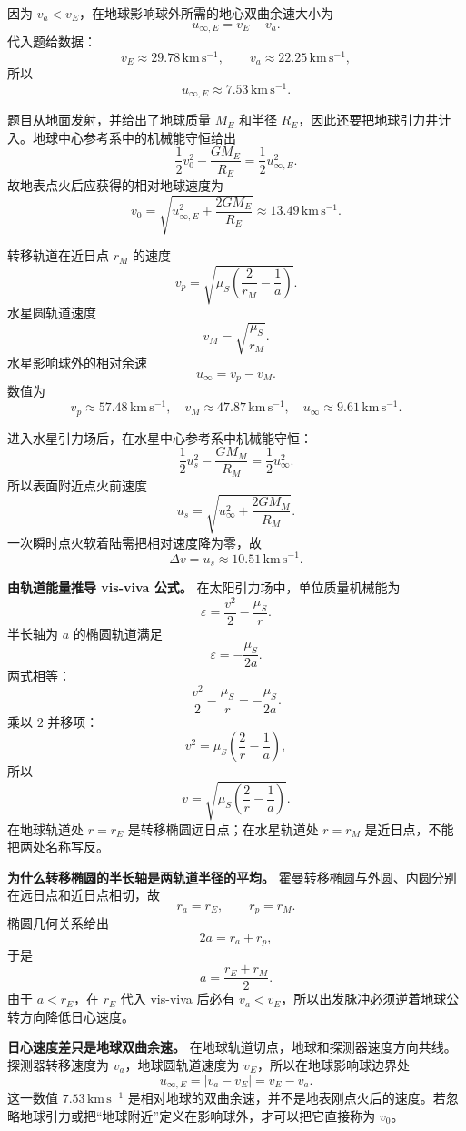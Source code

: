 \documentclass[12pt,a4paper,UTF8]{ctexart}
\begin{document}
因为 \(v_a<v_E\)，在地球影响球外所需的地心双曲余速大小为 \[
\boxed{u_{\infty,E}=v_E-v_a}. \tag{4}
\] 代入题给数据： \[
v_E\approx29.78\,\mathrm{km\,s^{-1}},
\qquad
v_a\approx22.25\,\mathrm{km\,s^{-1}}, \tag{5}
\] 所以 \[
\boxed{u_{\infty,E}\approx7.53\,\mathrm{km\,s^{-1}}}. \tag{6}
\]

题目从地面发射，并给出了地球质量 \(M_E\) 和半径
\(R_E\)，因此还要把地球引力井计入。地球中心参考系中的机械能守恒给出 \[
\frac12v_0^2-\frac{GM_E}{R_E}
=\frac12u_{\infty,E}^2. \tag{7}
\] 故地表点火后应获得的相对地球速度为 \[
\boxed{
v_0=\sqrt{u_{\infty,E}^2+\frac{2GM_E}{R_E}}
\approx13.49\,\mathrm{km\,s^{-1}}
}. \tag{8}
\]

转移轨道在近日点 \(r_M\) 的速度 \[
v_p=\sqrt{\mu_S\left(\frac2{r_M}-\frac1a\right)}. \tag{9}
\] 水星圆轨道速度 \[
v_M=\sqrt{\frac{\mu_S}{r_M}}. \tag{10}
\] 水星影响球外的相对余速 \[
u_\infty=v_p-v_M. \tag{11}
\] 数值为 \[
v_p\approx57.48\,\mathrm{km\,s^{-1}},
\quad
v_M\approx47.87\,\mathrm{km\,s^{-1}},
\quad
u_\infty\approx9.61\,\mathrm{km\,s^{-1}}. \tag{12}
\]

进入水星引力场后，在水星中心参考系中机械能守恒： \[
\frac12u_s^2-\frac{GM_M}{R_M}
=\frac12u_\infty^2. \tag{13}
\] 所以表面附近点火前速度 \[
u_s=\sqrt{u_\infty^2+\frac{2GM_M}{R_M}}. \tag{14}
\] 一次瞬时点火软着陆需把相对速度降为零，故 \[
\boxed{\Delta v=u_s\approx10.51\,\mathrm{km\,s^{-1}}}. \tag{15}
\]

\textbf{由轨道能量推导 vis-viva 公式。} 在太阳引力场中，单位质量机械能为
\[
\varepsilon=\frac{v^2}{2}-\frac{\mu_S}{r}.
\] 半长轴为 \(a\) 的椭圆轨道满足 \[
\varepsilon=-\frac{\mu_S}{2a}.
\] 两式相等： \[
\frac{v^2}{2}-\frac{\mu_S}{r}
=-\frac{\mu_S}{2a}.
\] 乘以 \(2\) 并移项： \[
v^2=\mu_S\left(\frac2r-\frac1a\right),
\] 所以 \[
v=\sqrt{\mu_S\left(\frac2r-\frac1a\right)}.
\] 在地球轨道处 \(r=r_E\) 是转移椭圆远日点；在水星轨道处 \(r=r_M\)
是近日点，不能把两处名称写反。

\textbf{为什么转移椭圆的半长轴是两轨道半径的平均。}
霍曼转移椭圆与外圆、内圆分别在远日点和近日点相切，故 \[
r_a=r_E,\qquad r_p=r_M.
\] 椭圆几何关系给出 \[
2a=r_a+r_p,
\] 于是 \[
a=\frac{r_E+r_M}{2}.
\] 由于 \(a<r_E\)，在 \(r_E\) 代入 vis-viva 后必有
\(v_a<v_E\)，所以出发脉冲必须逆着地球公转方向降低日心速度。

\textbf{日心速度差只是地球双曲余速。}
在地球轨道切点，地球和探测器速度方向共线。探测器转移速度为
\(v_a\)，地球圆轨道速度为 \(v_E\)，所以在地球影响球边界处 \[
u_{\infty,E}=|v_a-v_E|=v_E-v_a.
\] 这一数值 \(7.53\,\mathrm{km\,s^{-1}}\)
是相对地球的双曲余速，并不是地表刚点火后的速度。若忽略地球引力或把``地球附近''定义在影响球外，才可以把它直接称为
\(v_0\)。
\end{document}
